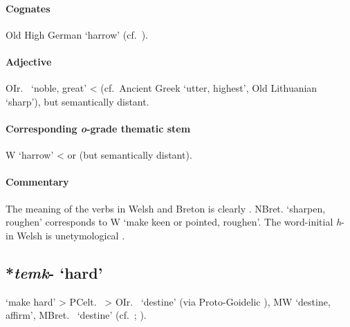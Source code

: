 \documentclass[output=paper,colorlinks,citecolor=brown]{langscibook}
\begin{document}
\paragraph*{Cognates}

Old High German  ‘harrow’ (cf.\ ).

\paragraph*{Adjective}

OIr.\   ‘noble, great’ <  (cf.\ Ancient Greek  ‘utter, highest’, Old Lithuanian  ‘sharp’), but semantically distant.

\paragraph*{Corresponding \textit{o}-grade thematic stem}

W  ‘harrow’ <  or  (but semantically distant).

\paragraph*{Commentary}

The meaning of the verbs in Welsh and Breton is clearly . NBret.  ‘sharpen, roughen’ corresponds to W  ‘make keen or pointed, roughen’. The word-initial \textit{h}- in Welsh is unetymological \citep[158]{Schumacher2000}.

\subsection{*\textit{temk}- ‘hard’}
\label{sec:Caushard}

 ‘make hard’ > PCelt.\  > OIr.\   ‘destine’ (via Proto-Goidelic ), MW  ‘destine, affirm’, MBret.\  ‘destine’ (cf.\ \citealt{Schumacher1995}; \citealt[158]{Schulze-Thulin2001}).
\end{document}
